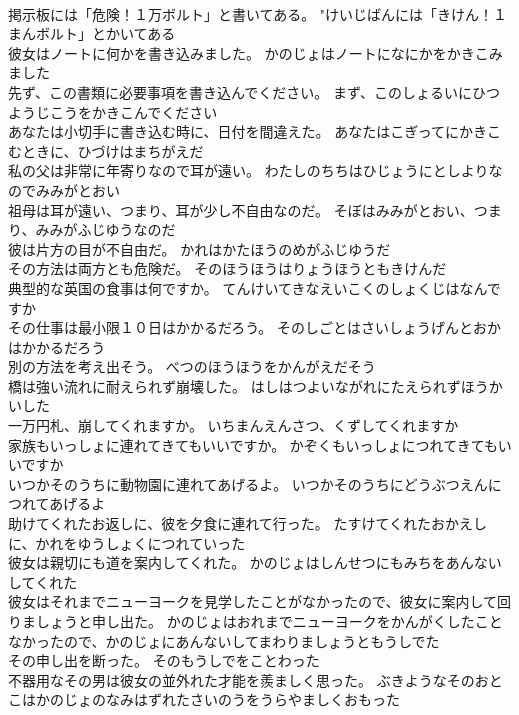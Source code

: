 \documentclass[8pt]{extreport}
\begin{document}
\begin{CJK}{UTF8}{min}
\\	掲示板には「危険！１万ボルト」と書いてある。	"けいじばんには「きけん！１まんボルト」とかいてある 
\\	彼女はノートに何かを書き込みました。	かのじょはノートになにかをかきこみました 
\\	先ず、この書類に必要事項を書き込んでください。	まず、このしょるいにひつようじこうをかきこんでください 
\\	あなたは小切手に書き込む時に、日付を間違えた。	あなたはこぎってにかきこむときに、ひづけはまちがえだ 
\\	私の父は非常に年寄りなので耳が遠い。	わたしのちちはひじょうにとしよりなのでみみがとおい 
\\	祖母は耳が遠い、つまり、耳が少し不自由なのだ。	そぼはみみがとおい、つまり、みみがふじゆうなのだ 
\\	彼は片方の目が不自由だ。	かれはかたほうのめがふじゆうだ 
\\	その方法は両方とも危険だ。	そのほうほうはりょうほうともきけんだ 
\\	典型的な英国の食事は何ですか。	てんけいてきなえいこくのしょくじはなんですか 
\\	その仕事は最小限１０日はかかるだろう。	そのしごとはさいしょうげんとおかはかかるだろう 
\\	別の方法を考え出そう。	べつのほうほうをかんがえだそう 
\\	橋は強い流れに耐えられず崩壊した。	はしはつよいながれにたえられずほうかいした 
\\	一万円札、崩してくれますか。	いちまんえんさつ、くずしてくれますか 
\\	家族もいっしょに連れてきてもいいですか。	かぞくもいっしょにつれてきてもいいですか 
\\	いつかそのうちに動物園に連れてあげるよ。	いつかそのうちにどうぶつえんにつれてあげるよ 
\\	助けてくれたお返しに、彼を夕食に連れて行った。	たすけてくれたおかえしに、かれをゆうしょくにつれていった 
\\	彼女は親切にも道を案内してくれた。	かのじょはしんせつにもみちをあんないしてくれた 
\\	彼女はそれまでニューヨークを見学したことがなかったので、彼女に案内して回りましょうと申し出た。	かのじょはおれまでニューヨークをかんがくしたことなかったので、かのじょにあんないしてまわりましょうともうしでた 
\\	その申し出を断った。	そのもうしでをことわった 
\\	不器用なその男は彼女の並外れた才能を羨ましく思った。	ぶきようなそのおとこはかのじょのなみはずれたさいのうをうらやましくおもった 

\end{CJK}
\end{document}
